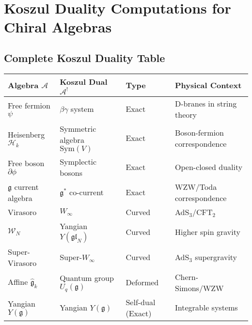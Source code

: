 \section{Koszul Duality Computations for Chiral Algebras}

\subsection{Complete Koszul Duality Table}

\begin{center}
\begin{tabular}{|l|l|l|l|}
\hline
\textbf{Algebra $\mathcal{A}$} & \textbf{Koszul Dual $\mathcal{A}^!$} & \textbf{Type} & \textbf{Physical Context} \\
\hline
Free fermion $\psi$ & $\beta\gamma$ system & Exact & D-branes in string theory \\
Heisenberg $\mathcal{H}_k$ & Symmetric algebra $\text{Sym}(V)$ & Exact & Boson-fermion correspondence \\
Free boson $\partial\phi$ & Symplectic bosons & Exact & Open-closed duality \\
$\mathfrak{g}$ current algebra & $\mathfrak{g}^*$ co-current & Exact & WZW/Toda correspondence \\
Virasoro & $W_\infty$ & Curved & AdS$_3$/CFT$_2$ \\
$\mathcal{W}_N$ & Yangian $Y(\mathfrak{gl}_N)$ & Curved & Higher spin gravity \\
Super-Virasoro & Super-$W_\infty$ & Curved & AdS$_3$ supergravity \\
Affine $\hat{\mathfrak{g}}_k$ & Quantum group $U_q(\mathfrak{g})$ & Deformed & Chern-Simons/WZW \\
Yangian $Y(\mathfrak{g})$ & Yangian $Y(\mathfrak{g})$ & Self-dual (Exact) & Integrable systems \\
\hline
\end{tabular}
\end{center}


